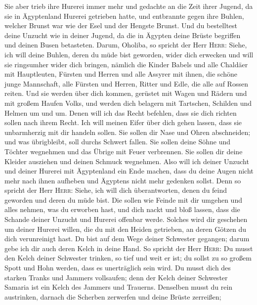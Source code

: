  Sie aber trieb ihre Hurerei immer mehr und gedachte an
die Zeit ihrer Jugend, da sie in Ägyptenland Hurerei getrieben hatte,
 und entbrannte gegen ihre Buhlen, welcher Brunst war wie
der Esel und der Hengste Brunst.  Und du bestelltest
deine Unzucht wie in deiner Jugend, da die in Ägypten deine Brüste
begriffen und deinen Busen betasteten.  Darum, Oholiba,
so spricht der Herr \textsc{Herr}: Siehe, ich will deine Buhlen, deren
du müde bist geworden, wider dich erwecken und will sie ringsumher wider
dich bringen,  nämlich die Kinder Babels und alle
Chaldäer mit Hauptleuten, Fürsten und Herren und alle Assyrer mit ihnen,
die schöne junge Mannschaft, alle Fürsten und Herren, Ritter und Edle,
die alle auf Rossen reiten.  Und sie werden über dich
kommen, gerüstet mit Wagen und Rädern und mit großem Haufen Volks, und
werden dich belagern mit Tartschen, Schilden und Helmen um und um. Denen
will ich das Recht befehlen, dass sie dich richten sollen nach ihrem
Recht.  Ich will meinen Eifer über dich gehen lassen,
dass sie unbarmherzig mit dir handeln sollen. Sie sollen dir Nase und
Ohren abschneiden; und was übrigbleibt, soll durchs Schwert fallen. Sie
sollen deine Söhne und Töchter wegnehmen und das Übrige mit Feuer
verbrennen.  Sie sollen dir deine Kleider ausziehen und
deinen Schmuck wegnehmen.  Also will ich deiner Unzucht
und deiner Hurerei mit Ägyptenland ein Ende machen, dass du deine Augen
nicht mehr nach ihnen aufheben und Ägyptens nicht mehr gedenken sollst.
 Denn so spricht der Herr \textsc{Herr}: Siehe, ich will
dich überantworten, denen du feind geworden und deren du müde bist.
 Die sollen wie Feinde mit dir umgehen und alles nehmen,
was du erworben hast, und dich nackt und bloß lassen, dass die Schande
deiner Unzucht und Hurerei offenbar werde.  Solches wird
dir geschehen um deiner Hurerei willen, die du mit den Heiden getrieben,
an deren Götzen du dich verunreinigt hast.  Du bist auf
dem Wege deiner Schwester gegangen; darum gebe ich dir auch deren Kelch
in deine Hand.  So spricht der Herr \textsc{Herr}: Du
musst den Kelch deiner Schwester trinken, so tief und weit er ist; du
sollst zu so großem Spott und Hohn werden, dass es unerträglich sein
wird.  Du musst dich des starken Tranks und Jammers
vollsaufen; denn der Kelch deiner Schwester Samaria ist ein Kelch des
Jammers und Trauerns.  Denselben musst du rein
austrinken, darnach die Scherben zerwerfen und deine Brüste zerreißen;
